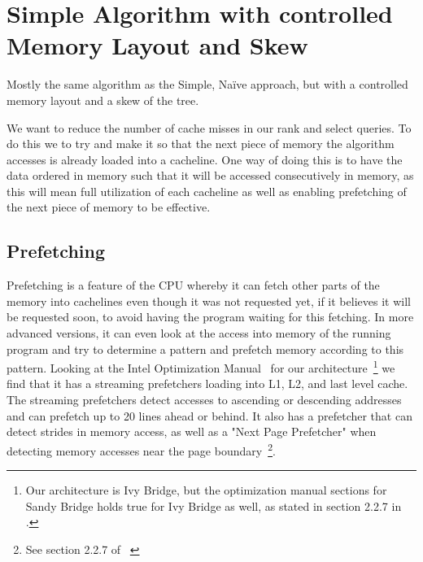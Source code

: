 \section{Simple Algorithm with controlled Memory Layout and Skew}
\label{sec:memorylayout}
Mostly the same algorithm as the Simple, Naïve approach, but with a controlled memory layout and a skew of the tree.

We want to reduce the number of cache misses in our rank and select queries. To do this we to try and make it so that the next piece of memory the algorithm accesses is already loaded into a cacheline. One way of doing this is to have the data ordered in memory such that it will be accessed consecutively in memory, as this will mean full utilization of each cacheline as well as enabling prefetching of the next piece of memory to be effective.

\subsection{Prefetching}
Prefetching is a feature of the CPU whereby it can fetch other parts of the memory into cachelines even though it was not requested yet, if it believes it will be requested soon, to avoid having the program waiting for this fetching.
In more advanced versions, it can even look at the access into memory of the running program and try to determine a pattern and prefetch memory according to this pattern.
Looking at the Intel Optimization Manual~\cite{intel-optimization-manual} for our architecture~\footnote{Our architecture is Ivy Bridge, but the optimization manual sections for Sandy Bridge holds true for Ivy Bridge as well, as stated in section 2.2.7 in \cite{intel-optimization-manual}.} we find that it has a streaming prefetchers loading into L1, L2, and last level cache. The streaming prefetchers detect accesses to ascending or descending addresses and can prefetch up to 20 lines ahead or behind. It also has a prefetcher that can detect strides in memory access, as well as a "Next Page Prefetcher" when detecting memory accesses near the page boundary~\footnote{See section 2.2.7 of ~\cite{intel-optimization-manual}}.


